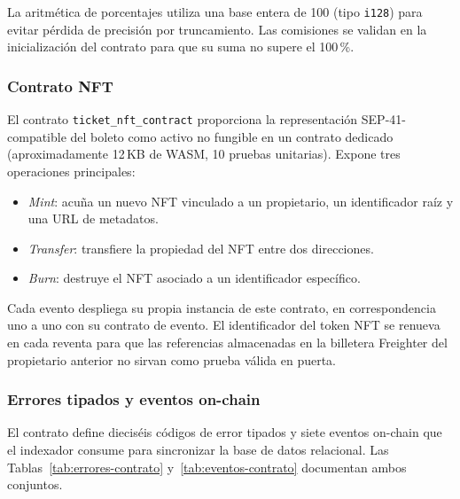 La aritmética de porcentajes utiliza una base entera de 100 (tipo \texttt{i128}) para evitar pérdida de precisión por truncamiento. Las comisiones se validan en la inicialización del contrato para que su suma no supere el 100\,\%.

\subsubsection{Contrato NFT}

El contrato \texttt{ticket\_nft\_contract} proporciona la representación SEP-41-compatible \cite{sep41} del
boleto como activo no fungible en un contrato dedicado (aproximadamente 12\,KB de WASM, 10 pruebas
unitarias). Expone tres operaciones principales:

\begin{itemize}\setlength{\itemsep}{2pt}
    \item \textit{Mint}: acuña un nuevo NFT vinculado a un propietario, un identificador raíz y una URL de
metadatos.
    \item \textit{Transfer}: transfiere la propiedad del NFT entre dos direcciones.
    \item \textit{Burn}: destruye el NFT asociado a un identificador específico.
\end{itemize}

Cada evento despliega su propia instancia de este contrato, en correspondencia uno a uno con su contrato de
evento. El identificador del token NFT se renueva en cada reventa para que las referencias almacenadas en la
billetera Freighter del propietario anterior no sirvan como prueba válida en puerta.

\subsubsection{Errores tipados y eventos on-chain}

El contrato define dieciséis códigos de error tipados y siete eventos on-chain que el indexador consume para
sincronizar la base de datos relacional. Las Tablas~\ref{tab:errores-contrato} y~\ref{tab:eventos-contrato}
documentan ambos conjuntos.

